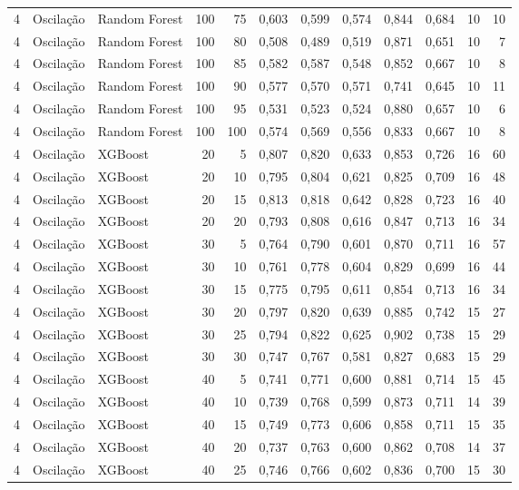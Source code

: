 \begin{longtable}{@{}rllrrrrrrrrr@{}}
4 & Oscilação & Random Forest & 100 & 75 & 0,603 & 0,599 & 0,574 & 0,844 & 0,684 & 10 & 10 \\
4 & Oscilação & Random Forest & 100 & 80 & 0,508 & 0,489 & 0,519 & 0,871 & 0,651 & 10 & 7 \\
4 & Oscilação & Random Forest & 100 & 85 & 0,582 & 0,587 & 0,548 & 0,852 & 0,667 & 10 & 8 \\
4 & Oscilação & Random Forest & 100 & 90 & 0,577 & 0,570 & 0,571 & 0,741 & 0,645 & 10 & 11 \\
4 & Oscilação & Random Forest & 100 & 95 & 0,531 & 0,523 & 0,524 & 0,880 & 0,657 & 10 & 6 \\
4 & Oscilação & Random Forest & 100 & 100 & 0,574 & 0,569 & 0,556 & 0,833 & 0,667 & 10 & 8 \\
4 & Oscilação & XGBoost & 20 & 5 & 0,807 & 0,820 & 0,633 & 0,853 & 0,726 & 16 & 60 \\
4 & Oscilação & XGBoost & 20 & 10 & 0,795 & 0,804 & 0,621 & 0,825 & 0,709 & 16 & 48 \\
4 & Oscilação & XGBoost & 20 & 15 & 0,813 & 0,818 & 0,642 & 0,828 & 0,723 & 16 & 40 \\
4 & Oscilação & XGBoost & 20 & 20 & 0,793 & 0,808 & 0,616 & 0,847 & 0,713 & 16 & 34 \\
4 & Oscilação & XGBoost & 30 & 5 & 0,764 & 0,790 & 0,601 & 0,870 & 0,711 & 16 & 57 \\
4 & Oscilação & XGBoost & 30 & 10 & 0,761 & 0,778 & 0,604 & 0,829 & 0,699 & 16 & 44 \\
4 & Oscilação & XGBoost & 30 & 15 & 0,775 & 0,795 & 0,611 & 0,854 & 0,713 & 16 & 34 \\
4 & Oscilação & XGBoost & 30 & 20 & 0,797 & 0,820 & 0,639 & 0,885 & 0,742 & 15 & 27 \\
4 & Oscilação & XGBoost & 30 & 25 & 0,794 & 0,822 & 0,625 & 0,902 & 0,738 & 15 & 29 \\
4 & Oscilação & XGBoost & 30 & 30 & 0,747 & 0,767 & 0,581 & 0,827 & 0,683 & 15 & 29 \\
4 & Oscilação & XGBoost & 40 & 5 & 0,741 & 0,771 & 0,600 & 0,881 & 0,714 & 15 & 45 \\
4 & Oscilação & XGBoost & 40 & 10 & 0,739 & 0,768 & 0,599 & 0,873 & 0,711 & 14 & 39 \\
4 & Oscilação & XGBoost & 40 & 15 & 0,749 & 0,773 & 0,606 & 0,858 & 0,711 & 15 & 35 \\
4 & Oscilação & XGBoost & 40 & 20 & 0,737 & 0,763 & 0,600 & 0,862 & 0,708 & 14 & 37 \\
4 & Oscilação & XGBoost & 40 & 25 & 0,746 & 0,766 & 0,602 & 0,836 & 0,700 & 15 & 30 \\

\end{longtable}
